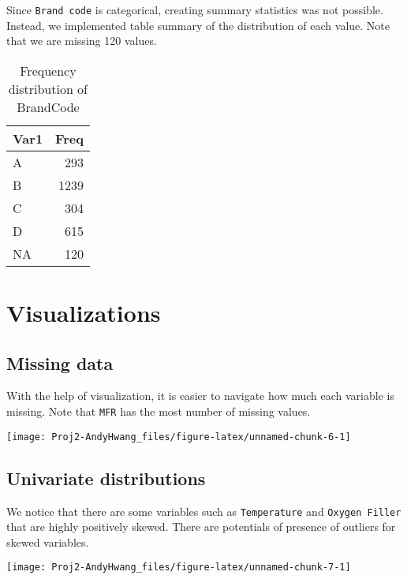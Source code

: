 \documentclass[]{report}
\begin{document}
Since \texttt{Brand\ code} is categorical, creating summary statistics
was not possible. Instead, we implemented table summary of the
distribution of each value. Note that we are missing 120 values.

\begin{table}[H]

\caption{\label{tab:unnamed-chunk-5}Frequency distribution of BrandCode}
\centering
\fontsize{8}{10}\selectfont
\begin{tabular}[t]{lr}
\toprule
\textbf{Var1} & \textbf{Freq}\\
\midrule
\rowcolor{gray!6}  A & 293\\
B & 1239\\
\rowcolor{gray!6}  C & 304\\
D & 615\\
\rowcolor{gray!6}  NA & 120\\
\bottomrule
\end{tabular}
\end{table}

\section{Visualizations}\label{visualizations}

\subsection{Missing data}\label{missing-data}

With the help of visualization, it is easier to navigate how much each
variable is missing. Note that \texttt{MFR} has the most number of
missing values.

\begin{center}\texttt{[image: Proj2-AndyHwang\_files/figure-latex/unnamed-chunk-6-1]} \end{center}

\subsection{Univariate distributions}\label{univariate-distributions}

We notice that there are some variables such as \texttt{Temperature} and
\texttt{Oxygen\ Filler} that are highly positively skewed. There are
potentials of presence of outliers for skewed variables.

\begin{center}\texttt{[image: Proj2-AndyHwang\_files/figure-latex/unnamed-chunk-7-1]} \end{center}
\end{document}
